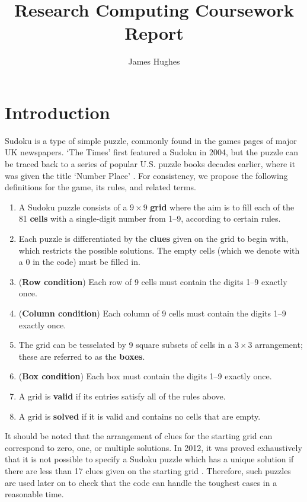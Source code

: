 \documentclass[12pt]{article}
\title{Research Computing Coursework Report}
\author{James Hughes}
\begin{document}
\maketitle
\newpage

\tableofcontents
\section{Introduction}

Sudoku is a type of simple puzzle, commonly found in the games pages of major UK newspapers.
`The Times' first featured a Sudoku in 2004, but the puzzle can be traced back to a series of popular U.S. puzzle books decades earlier, where it was given the title `Number Place' \cite{sudoku}.
For consistency, we propose the following definitions for the game, its rules, and related terms.

\begin{enumerate}
    \item A Sudoku puzzle consists of a $9\times9$ \textbf{grid} where the aim is to fill each of the 81 \textbf{cells} with a single-digit number from 1--9, according to certain rules.
    \item Each puzzle is differentiated by the \textbf{clues} given on the grid to begin with, which restricts the possible solutions. The empty cells (which we denote with a $0$ in the code) must be filled in.
    \item (\textbf{Row condition}) Each row of 9 cells must contain the digits 1--9 exactly once.
    \item (\textbf{Column condition}) Each column of 9 cells must contain the digits 1--9 exactly once.
    \item The grid can be tesselated by 9 square subsets of cells in a $3\times3$ arrangement; these are referred to as the \textbf{boxes}.
    \item (\textbf{Box condition}) Each box must contain the digits 1--9 exactly once.
    \item A grid is \textbf{valid} if its entries satisfy all of the rules above.
    \item A grid is \textbf{solved} if it is valid and contains no cells that are empty.
\end{enumerate}

It should be noted that the arrangement of clues for the starting grid can correspond to zero, one, or multiple solutions.
In 2012, it was proved exhaustively that it is not possible to specify a Sudoku puzzle which has a unique solution if there are less than 17 clues given on the starting grid \cite{17min}.
Therefore, such puzzles are used later on to check that the code can handle the toughest cases in a reasonable time.
\end{document}
